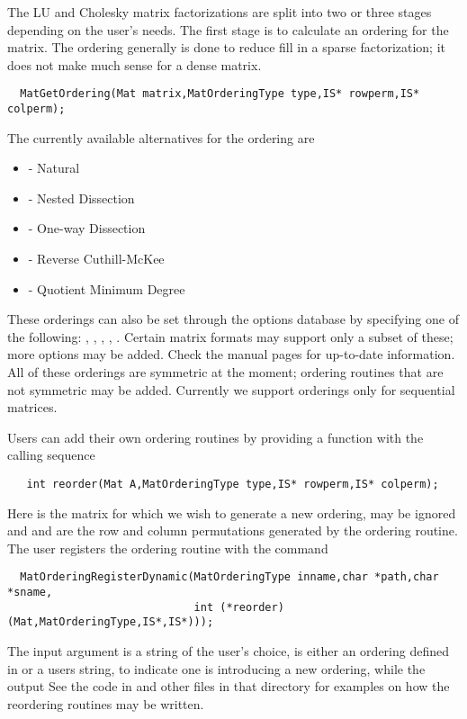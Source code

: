 The LU and Cholesky 
matrix factorizations are split into 
two or three stages depending on the user's needs. The first stage is 
to calculate an ordering for the matrix.  The ordering generally is 
done to reduce fill in a sparse factorization; it does not make much 
sense for a dense matrix.  
\begin{verbatim}
  MatGetOrdering(Mat matrix,MatOrderingType type,IS* rowperm,IS* colperm); 
\end{verbatim}
The currently available alternatives for the ordering  are 
\begin{itemize}
\item {} - Natural
\item {} - Nested Dissection
\item {} - One-way Dissection
\item {} - Reverse Cuthill-McKee
\item {} - Quotient Minimum Degree
\end{itemize}
These orderings can also be set through the options database by specifying 
one of the following:   ,  , 
 ,  , 
.
  
  
  
 
Certain matrix formats may support only a subset of these; more options may 
be added. Check the manual pages for up-to-date information. All of these orderings are 
symmetric at the moment; ordering routines that are 
not symmetric may be added. Currently we support orderings only for 
sequential matrices.

Users can add their own ordering routines 
by providing a function with the calling sequence
\begin{verbatim}
   int reorder(Mat A,MatOrderingType type,IS* rowperm,IS* colperm);
\end{verbatim}
Here  is the matrix for which we wish to generate a new ordering, 
 may be ignored and  and  are the row
and column permutations generated by the ordering routine.
The user registers the ordering routine
with the command
\begin{verbatim}
  MatOrderingRegisterDynamic(MatOrderingType inname,char *path,char *sname,
                             int (*reorder)(Mat,MatOrderingType,IS*,IS*)));
\end{verbatim}
The   
input argument  is a string of the user's choice,  is either 
an ordering defined in  or a users string,
to indicate one is introducing a new ordering, while the output
See the code in  and other files in that 
directory for examples on how the reordering routines may be written.

